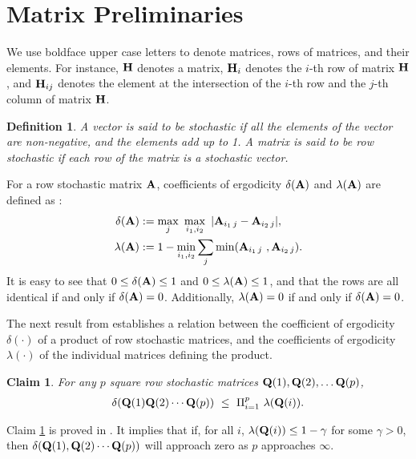 \documentclass[letterpaper, 12pt]{article}
\newtheorem{claim}{Claim}
\newtheorem{definition}{Definition}
\begin{document}
\section{Matrix Preliminaries}

We use boldface upper case letters to denote matrices,
rows of matrices, and their elements. For instance,
${\bf H}$ denotes a matrix, ${\bf H}_i$ denotes the $i$-th row of
matrix ${\bf H}$, and ${\bf H}_{ij}$ denotes the element at the
intersection of the $i$-th row and the $j$-th column
of matrix ${\bf H}$.

\begin{definition}
\label{d_stochastic}
A vector is said to be {\em stochastic} if all the elements
of the vector are {\em non-negative}, and the elements add up to 1.
A matrix is said to be row stochastic if each row of the matrix is a
stochastic vector.
\end{definition}

For a row stochastic matrix ${\bf A}$,
 coefficients of ergodicity $\delta({\bf A})$ and $\lambda({\bf A})$ are defined as
\cite{Wolfowitz}:
\begin{align}
\delta({\bf A}) & :=   \max_j ~ \max_{i_1,i_2}~ | {\bf A}_{i_1\,j}-{\bf A}_{i_2\,j} |, \label{e_delta} \\
\lambda({\bf A}) & :=  1 - \min_{i_1,i_2} \sum_j \min({\bf A}_{i_1\,j} ~, {\bf A}_{i_2\,j}). \label{e_lambda}
\end{align}
It  is easy to see that  $0\leq \delta({\bf A}) \leq 1$ and $0\leq \lambda({\bf A}) \leq 1$, and that the rows are all identical if and only if $\delta({\bf A})=0$. Additionally, $\lambda({\bf A}) = 0$ if and only if $\delta({\bf A}) = 0$.


The next result from \cite{Hajnal58} establishes a relation between the coefficient of ergodicity $\delta(\cdot)$ of a product of row stochastic matrices, and the coefficients of ergodicity $\lambda(\cdot)$ of the individual matrices defining the product. 

\begin{claim}
\label{claim_delta}
For any $p$ square row stochastic matrices ${\bf Q}(1),{\bf Q}(2),\dots {\bf Q}(p)$, 
\begin{align}
\delta({\bf Q}(1){\bf Q}(2)\cdots {\bf Q}(p)) ~\leq ~
 \Pi_{i=1}^p ~ \lambda({\bf Q}(i)). 
\end{align}
\end{claim}
Claim \ref{claim_delta} is proved in \cite{Hajnal58}. It implies that
if, for all $i$, $\lambda({\bf Q}(i))\leq 1-\gamma$ for some $\gamma>0$, then $\delta({\bf Q}(1),{\bf Q}(2)\cdots {\bf Q}(p))$ will approach zero as $p$ approaches $\infty$. 
\end{document}
